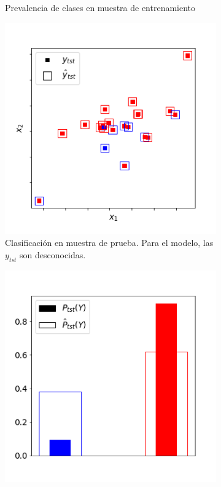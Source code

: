 \begin{figure}[h]
\begin{subfigure}[t]{0.4\textwidth}
        \caption{Prevalencia de clases en muestra de
        entrenamiento}\label{cambios:prevalencia_tr}
    \end{subfigure}
    \medskip
    \begin{subfigure}[t]{0.4\textwidth}
        \centering
        \includegraphics[width=\textwidth]{../plots_teoria/cambios_test_scatterplot.png}
        \caption{Clasificación en muestra de prueba. Para el modelo, las
        $y_{tst}$ son desconocidas.}\label{cambios:clasificacion_tst}
    \end{subfigure}
    \hfill
    \begin{subfigure}[t]{0.4\textwidth}
        \centering
        \includegraphics[width=\textwidth]{../plots_teoria/cambios_test_barplot.png}

\end{subfigure}
\end{figure}
